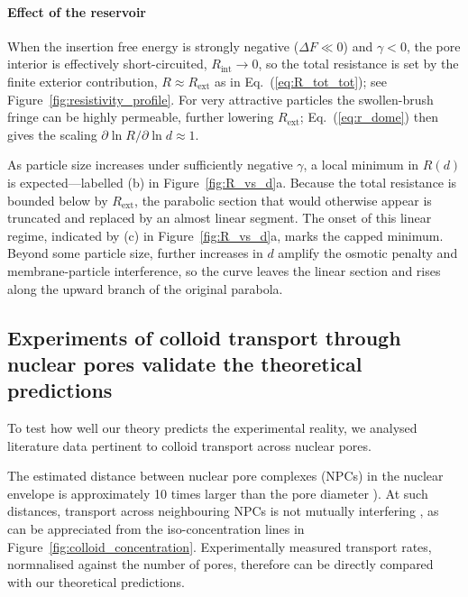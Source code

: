 \documentclass[12pt, a4paper]{article}
\begin{document}
\paragraph{Effect of the reservoir}
When the insertion free energy is strongly negative ($\Delta F \!\ll\! 0$) and $\gamma<0$, the pore interior is effectively short-circuited, $R_{\text{int}} \to 0$, so the total resistance is set by the finite exterior contribution, $R\approx R_{\text{ext}}$ as in Eq.~(\ref{eq:R_tot_tot}); see Figure~\ref{fig:resistivity_profile}.  
For very attractive particles the swollen-brush fringe can be highly permeable, further lowering $R_{\text{ext}}$; Eq.~(\ref{eq:r_dome}) then gives the scaling  
$\partial\ln R/\partial\ln d \approx 1$.

As particle size increases under sufficiently negative $\gamma$, a local minimum in $R(d)$ is expected—labelled \raisebox{0.25em}{\scriptsize$\uparrow$}(b) in Figure~\ref{fig:R_vs_d}a.  
Because the total resistance is bounded below by $R_{\text{ext}}$, the parabolic section that would otherwise appear is truncated and replaced by an almost linear segment.  
The onset of this linear regime, indicated by \raisebox{0.25em}{\scriptsize$\uparrow$}(c) in Figure~\ref{fig:R_vs_d}a, marks the capped minimum.  
Beyond some particle size, further increases in $d$ amplify the osmotic penalty and membrane-particle interference, so the curve leaves the linear section and rises along the upward branch of the original parabola.

\subsection{Experiments of colloid transport through nuclear pores validate the theoretical predictions}

To test how well our theory predicts the experimental reality, we analysed literature data pertinent to colloid transport across nuclear pores.

The estimated distance between nuclear pore complexes (NPCs) in the nuclear envelope is approximately 10 times larger than the pore diameter \cite{Yang2004, Daigle2001, Feldherr1984, Kubitscheck2000}). At such distances, transport across neighbouring NPCs is not mutually interfering \cite{Fabrikant1985}, as can be appreciated from the iso-concentration lines in Figure~\ref{fig:colloid_concentration}. Experimentally measured transport rates, normnalised against the number of pores, therefore can be directly compared with our theoretical predictions.  
\end{document}
